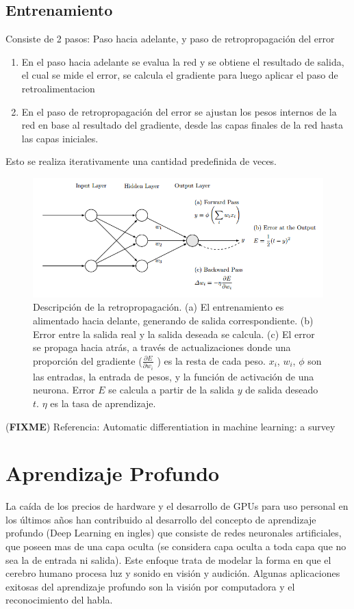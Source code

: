 \documentclass[a4paper,11pt,spanish]{book}
\newcommand*{\FIXME}[1]{{(\textbf{FIXME}) {#1}}}
\begin{document}
    \subsection {Entrenamiento}
      Consiste de 2 pasos: Paso hacia adelante, y paso de retropropagación del error
      \begin{enumerate}
	\item En el paso hacia adelante se evalua la red y se obtiene el resultado de salida, el cual se mide el error, se calcula el gradiente para luego aplicar el paso de retroalimentacion
	\item En el paso de retropropagación del error se ajustan los pesos internos de la red en base al resultado del gradiente, desde las capas finales de la red hasta las capas iniciales.
      \end{enumerate}
      Esto se realiza iterativamente una cantidad predefinida de veces.
      \begin{figure}[H]
	\includegraphics[scale=0.5]{./img/backprop.png}
	\caption{ Descripción de la retropropagación. (a) El entrenamiento es alimentado hacia delante, generando de salida correspondiente. (b) Error entre la salida real y la salida deseada
	se calcula. (c) El error se propaga hacia atrás, a través de actualizaciones donde una proporción del gradiente ($ \frac{\partial E}{\partial w_i}$ ) es la resta de cada peso. $x_i$, $w_i$, $\phi$ son las entradas,
	la entrada de pesos, y la función de activación de una neurona. Error $E$ se calcula a partir de la salida $y$ de salida deseado $t$. $\eta$ es la tasa de aprendizaje.}
	\label{fig:backprop}
      \end{figure}
      \FIXME{Referencia: Automatic differentiation in machine learning: a survey}

  \section {Aprendizaje Profundo}
    La caída de los precios de hardware y el desarrollo de GPUs para uso personal en los últimos años han contribuido al desarrollo del concepto de aprendizaje profundo (Deep Learning en ingles)
    que consiste de redes neuronales artificiales, que poseen mas de una capa oculta (se considera capa oculta a toda capa que no sea la de entrada ni salida). Este enfoque trata de
    modelar la forma en que el cerebro humano procesa luz y sonido en visión y audición.
    Algunas aplicaciones exitosas del aprendizaje profundo son la visión por computadora y el reconocimiento del habla.
\end{document}
